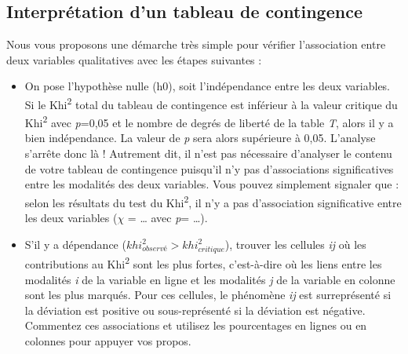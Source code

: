 \documentclass[
  11pt,
  french,
]{book}
\begin{document}
\hypertarget{sect0424}{%
\subsection{Interprétation d'un tableau de contingence}\label{sect0424}}

Nous vous proposons une démarche très simple pour vérifier l'association entre deux variables qualitatives avec les étapes suivantes :

\begin{itemize}
\item
  On pose l'hypothèse nulle (h0), soit l'indépendance entre les deux variables. Si le Khi\textsuperscript{2} total du tableau de contingence est inférieur à la valeur critique du Khi\textsuperscript{2} avec \emph{p}=0,05 et le nombre de degrés de liberté de la table \emph{T}, alors il y a bien indépendance. La valeur de \emph{p} sera alors supérieure à 0,05. L'analyse s'arrête donc là ! Autrement dit, il n'est pas nécessaire d'analyser le contenu de votre tableau de contingence puisqu'il n'y pas d'associations significatives entre les modalités des deux variables. Vous pouvez simplement signaler que : selon les résultats du test du Khi\textsuperscript{2}, il n'y a pas d'association significative entre les deux variables (\(\chi\) = \ldots{} avec \emph{p}= \ldots).
\item
  S'il y a dépendance (\(khi_{observé}^2 > khi_{critique}^2\)), trouver les cellules \emph{ij} où les contributions au Khi\textsuperscript{2} sont les plus fortes, c'est-à-dire où les liens entre les modalités \emph{i} de la variable en ligne et les modalités \emph{j} de la variable en colonne sont les plus marqués. Pour ces cellules, le phénomène \emph{ij} est surreprésenté si la déviation est positive ou sous-représenté si la déviation est négative. Commentez ces associations et utilisez les pourcentages en lignes ou en colonnes pour appuyer vos propos.
\end{itemize}
\end{document}
